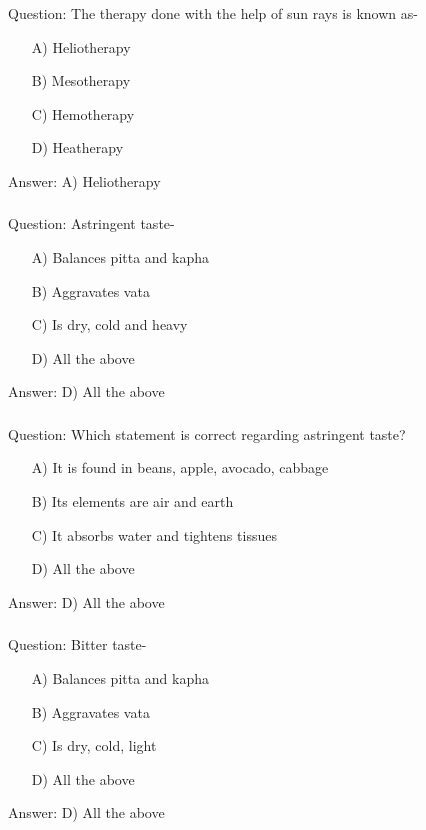 \begin{frame}[fragile]\frametitle{}

Question: The therapy done with the help of sun rays is known as-

\begin{itemize}
\item[A)] Heliotherapy
\item[B)] Mesotherapy
\item[C)] Hemotherapy
\item[D)] Heatherapy
\end{itemize}

Answer: A) Heliotherapy
\end{frame}

\begin{frame}[fragile]\frametitle{}

Question: Astringent taste-

\begin{itemize}
\item[A)] Balances pitta and kapha
\item[B)] Aggravates vata
\item[C)] Is dry, cold and heavy
\item[D)] All the above
\end{itemize}

Answer: D) All the above
\end{frame}

\begin{frame}[fragile]\frametitle{}

Question: Which statement is correct regarding astringent taste?

\begin{itemize}
\item[A)] It is found in beans, apple, avocado, cabbage
\item[B)] Its elements are air and earth
\item[C)] It absorbs water and tightens tissues
\item[D)] All the above
\end{itemize}

Answer: D) All the above
\end{frame}

\begin{frame}[fragile]\frametitle{}

Question: Bitter taste-

\begin{itemize}
\item[A)] Balances pitta and kapha
\item[B)] Aggravates vata
\item[C)] Is dry, cold, light
\item[D)] All the above
\end{itemize}

Answer: D) All the above
\end{frame}

